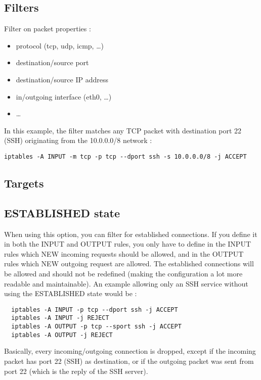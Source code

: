 \documentclass[a4paper,12pt]{article}
\begin{document}
  \subsection{Filters}

    Filter on packet properties :
    \begin{itemize}
      \item protocol (tcp, udp, icmp, \ldots)
      \item destination/source port
      \item destination/source IP address
      \item in/outgoing interface (eth0, \ldots)
      \item \ldots
    \end{itemize}

    In this example, the filter matches any TCP packet with destination port 22 (SSH) originating from the 10.0.0.0/8 network :
    \begin{verbatim}
iptables -A INPUT -m tcp -p tcp --dport ssh -s 10.0.0.0/8 -j ACCEPT
    \end{verbatim}

  \subsection{Targets}

  \subsection{ESTABLISHED state}
When using this option, you can filter for established connections. If you define it in both the INPUT and OUTPUT rules, you only have to define in the INPUT rules which NEW incoming requests should be allowed, and in the OUTPUT rules which NEW outgoing request are allowed. The established connections will be allowed and should not be redefined (making the configuration a lot more readable and maintainable). An example allowing only an SSH service without using the ESTABLISHED state would be :
\begin{verbatim}
  iptables -A INPUT -p tcp --dport ssh -j ACCEPT
  iptables -A INPUT -j REJECT
  iptables -A OUTPUT -p tcp --sport ssh -j ACCEPT
  iptables -A OUTPUT -j REJECT
\end{verbatim}

Basically, every incoming/outgoing connection is dropped, except if the incoming packet has port 22 (SSH) as destination, or if the outgoing packet was sent from port 22 (which is the reply of the SSH server).\\
\end{document}
